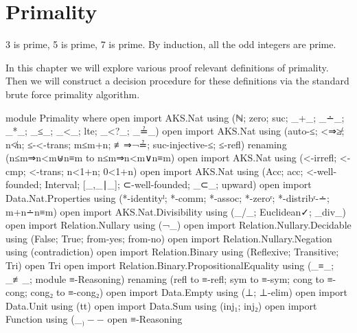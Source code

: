 \documentclass[./Thesis.tex]{subfiles}
\begin{document}
\chapter{Primality}
\label{chap:primality}

\epigraph{
  3 is prime, 5 is prime, 7 is prime. By induction, all the odd integers are
  prime.
}{\cite{leroy}}
In this chapter we will explore various proof relevant definitions of primality.
Then we will construct a decision procedure for these definitions via the
standard brute force primality algorithm.
\begin{code}[hide]
  module Primality where
  open import AKS.Nat using (ℕ; zero; suc; _+_; _∸_; _*_; _≤_; _<_; lte; _<?_; _≟_)
  open import AKS.Nat using (auto-≤; <⇒≱; n≮n; ≤-<-trans; m≤m+n; ≢⇒¬≟; suc-injective-≤; ≤-refl) renaming (n≤m⇒n<m⊎n≡m to n≤m⇒n<m∨n≡m)
  open import AKS.Nat using (<-irrefl; <-cmp; <-trans; n<1+n; 0<1+n)
  open import AKS.Nat using (Acc; acc; <-well-founded; Interval; [_,_∣_]; ⊂-well-founded; _⊂_; upward)
  open import Data.Nat.Properties using (*-identityˡ; *-comm; *-assoc; *-zeroʳ; *-distribʳ-∸; m+n∸n≡m)
  open import AKS.Nat.Divisibility using (_/_; Euclidean✓; _div_)
  open import Relation.Nullary using (¬_)
  open import Relation.Nullary.Decidable using (False; True; from-yes; from-no)
  open import Relation.Nullary.Negation using (contradiction)
  open import Relation.Binary using (Reflexive; Transitive; Tri)
  open Tri
  open import Relation.Binary.PropositionalEquality
    using (_≡_; _≢_; module ≡-Reasoning)
    renaming (refl to ≡-refl; sym to ≡-sym; cong to ≡-cong; cong₂ to ≡-cong₂)
  open import Data.Empty using (⊥; ⊥-elim)
  open import Data.Unit using (tt)
  open import Data.Sum using (inj₁; inj₂)
  open import Function using (_$_) -- $
  open ≡-Reasoning
\end{code}
\end{document}
